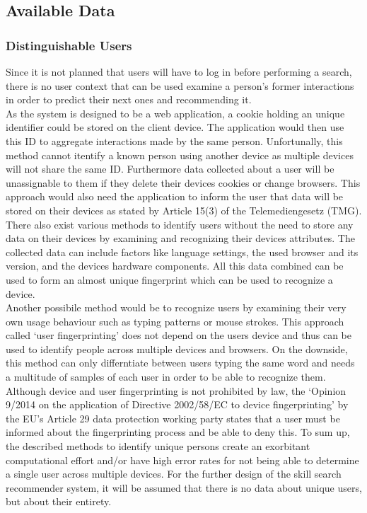 \subsection{Available Data}
\subsubsection{Distinguishable Users}
Since it is not planned that users will have to log in before performing a search,
there is no user context that can be used examine a person's former interactions
in order to predict their next ones and recommending it.\\
As the system is designed to be a web application, a cookie holding an unique identifier could be stored on the client device. The application would then use this ID to aggregate interactions made by the same person. Unfortunally, this method cannot itentify a known person using another device as multiple devices will not share the same ID. Furthermore data collected about a user will be unassignable to them if they delete their devices cookies or change browsers.
This approach would also need the application to inform the user that data will be stored on their devices as stated by Article 15(3) of the Telemediengesetz (TMG).\label{cookie}\\
There also exist various methods to identify users without the need to store any data on their devices by examining and recognizing their devices attributes. The collected data can include
factors like language settings, the used browser and its version, and the devices hardware components. All this data combined can be used to form an almost unique fingerprint which can be used to recognize a device. \cite{finger}\\
Another possibile method would be to recognize users by examining their very own usage behaviour such as typing patterns or mouse strokes. This approach called `user fingerprinting' does not depend on the users device and thus can be used to identify people across multiple devices and browsers. On the downside, this method can only differntiate between users typing the same word and needs a multitude of samples of each user in order to be able to recognize them. \cite{typing}
Although device and user fingerprinting is not prohibited by law,
the `Opinion 9/2014 on the application of Directive 2002/58/EC to device
fingerprinting' by the EU's Article 29 data protection working party states that a user must be informed about the fingerprinting process and be able to deny this.
To sum up, the described methods to identify unique persons create an exorbitant computational effort and/or have high error rates for not being able to determine a single user across multiple devices. For the further design of the skill search recommender system, it will be assumed that there is no data about unique users, but about their entirety.

